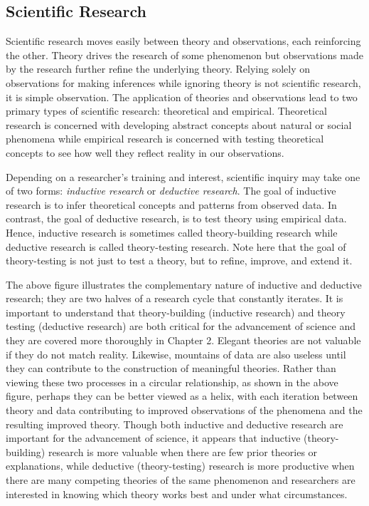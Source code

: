 \documentclass[]{book}
\theoremstyle{definition}
\theoremstyle{definition}
\theoremstyle{definition}
\theoremstyle{remark}
\begin{document}
\hypertarget{scientific-research}{%
\subsection{Scientific Research}\label{scientific-research}}

Scientific research moves easily between theory and observations, each
reinforcing the other. Theory drives the research of some phenomenon but
observations made by the research further refine the underlying theory.
Relying solely on observations for making inferences while ignoring
theory is not scientific research, it is simple observation. The
application of theories and observations lead to two primary types of
scientific research: theoretical and empirical. Theoretical research is
concerned with developing abstract concepts about natural or social
phenomena while empirical research is concerned with testing theoretical
concepts to see how well they reflect reality in our observations.

Depending on a researcher's training and interest, scientific inquiry
may take one of two forms: \emph{inductive research} or \emph{deductive
research}. The goal of inductive research is to infer theoretical
concepts and patterns from observed data. In contrast, the goal of
deductive research, is to test theory using empirical data. Hence,
inductive research is sometimes called theory-building research while
deductive research is called theory-testing research. Note here that the
goal of theory-testing is not just to test a theory, but to refine,
improve, and extend it.

The above figure illustrates the complementary nature of inductive and
deductive research; they are two halves of a research cycle that
constantly iterates. It is important to understand that theory-building
(inductive research) and theory testing (deductive research) are both
critical for the advancement of science and they are covered more
thoroughly in Chapter 2. Elegant theories are not valuable if they do
not match reality. Likewise, mountains of data are also useless until
they can contribute to the construction of meaningful theories. Rather
than viewing these two processes in a circular relationship, as shown in
the above figure, perhaps they can be better viewed as a helix, with
each iteration between theory and data contributing to improved
observations of the phenomena and the resulting improved theory. Though
both inductive and deductive research are important for the advancement
of science, it appears that inductive (theory-building) research is more
valuable when there are few prior theories or explanations, while
deductive (theory-testing) research is more productive when there are
many competing theories of the same phenomenon and researchers are
interested in knowing which theory works best and under what
circumstances.
\end{document}
